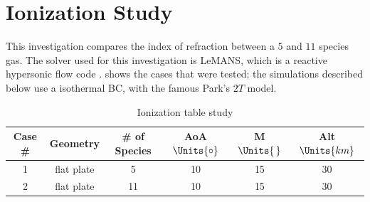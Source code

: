 \section{Ionization Study\label{ch4:ionizationStudy}}
    This investigation compares the index of refraction between a $5$ and $11$
    species gas. The solver used for this investigation is
    \gls{LeMANS}, which is a reactive hypersonic flow
    code \cite{Scalabrin2007}.  shows
    the cases that were tested; the simulations described below use a
    isothermal BC, with the famous Park's $2T$ \cite{Park1989} model.

    \begin{table}[H]
        \centering
        \begin{tabular}{|c|c|c|c|c|c|}
            \hline
            Case \# & Geometry & \# of Species & AoA $\Units{{\circ}}$ & M
            $\Units{\,}$ & Alt $\Units{km}$ \\
            \hline \hline
            1 & flat plate & 5 & 10 & 15 & 30  \\
            \hline
            2 & flat plate & 11 & 10 & 15 & 30  \\
            \hline
        \end{tabular}
        \caption{Ionization table study\label{tab:ionizationTableStudy}}
    \end{table}

